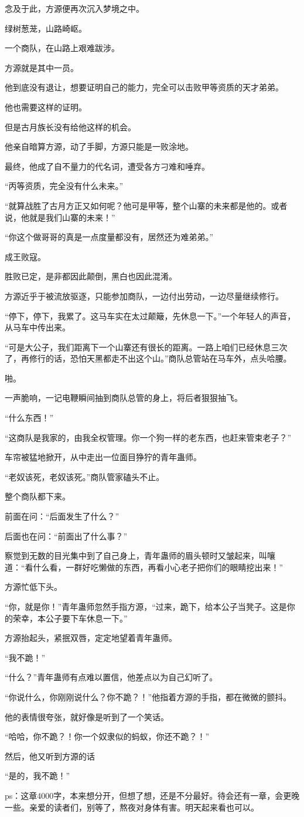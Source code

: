 \begin{this_body}
念及于此，方源便再次沉入梦境之中。

绿树葱茏，山路崎岖。

一个商队，在山路上艰难跋涉。

方源就是其中一员。

他到底没有退让，想要证明自己的能力，完全可以击败甲等资质的天才弟弟。

他也需要这样的证明。

但是古月族长没有给他这样的机会。

他亲自暗算方源，动了手脚，方源只能是一败涂地。

最终，他成了自不量力的代名词，遭受各方刁难和唾弃。

“丙等资质，完全没有什么未来。”

“就算战胜了古月方正又如何呢？他可是甲等，整个山寨的未来都是他的。或者说，他就是我们山寨的未来！”

“你这个做哥哥的真是一点度量都没有，居然还为难弟弟。”

成王败寇。

胜败已定，是非都因此颠倒，黑白也因此混淆。

方源近乎于被流放驱逐，只能参加商队，一边付出劳动，一边尽量继续修行。

“停下，停下，我累了。这马车实在太过颠簸，先休息一下。”一个年轻人的声音，从马车中传出来。

“可是大公子，我们距离下一个山寨还有很长的距离。一路上咱们已经休息三次了，再修行的话，恐怕天黑都走不出这个山。”商队总管站在马车外，点头哈腰。

啪。

一声脆响，一记电鞭瞬间抽到商队总管的身上，将后者狠狠抽飞。

“什么东西！”

“这商队是我家的，由我全权管理。你一个狗一样的老东西，也赶来管束老子？”

车帘被猛地掀开，从中走出一位面目狰狞的青年蛊师。

“老奴该死，老奴该死。”商队管家磕头不止。

整个商队都下来。

前面在问：“后面发生了什么？”

后面也在问：“前面出了什么事？”

察觉到无数的目光集中到了自己身上，青年蛊师的眉头顿时又皱起来，叫嚷道：“看什么看，一群好吃懒做的东西，再看小心老子把你们的眼睛挖出来！”

方源忙低下头。

“你，就是你！”青年蛊师忽然手指方源，“过来，跪下，给本公子当凳子。这是你的荣幸，本公子要下车休息一下。”

方源抬起头，紧抿双唇，定定地望着青年蛊师。

“我不跪！”

“什么？”青年蛊师有点难以置信，他差点以为自己幻听了。

“你说什么，你刚刚说什么？你不跪？！”他指着方源的手指，都在微微的颤抖。

他的表情很夸张，就好像是听到了一个笑话。

“哈哈，你不跪？！你一个奴隶似的蚂蚁，你还不跪？！”

然后，他又听到方源的话

“是的，我不跪！”

ps：这章4000字，本来想分开，但想了想，还是不分最好。待会还有一章，会更晚一些。亲爱的读者们，别等了，熬夜对身体有害。明天起来看也可以。

\end{this_body}

